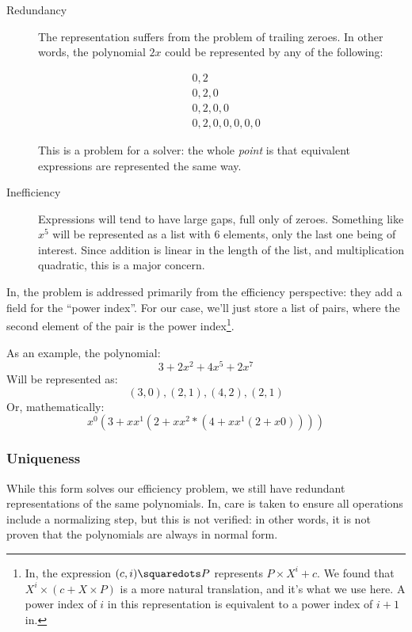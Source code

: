 \documentclass[draft, twocolumn]{article}
\theoremstyle{definition}
\begin{document}
\begin{description}
  \item[Redundancy] The representation suffers from the problem of trailing
    zeroes. In other words, the polynomial $2x$ could be represented by any of
    the following:
  
    \begin{align*}
      & 0, 2 \\
      & 0, 2, 0 \\
      & 0, 2, 0, 0 \\
      & 0, 2, 0, 0, 0, 0, 0
    \end{align*}
    
    This is a problem for a solver: the whole \emph{point} is that equivalent
    expressions are represented the same way.

  \item[Inefficiency] Expressions will tend to have large gaps, full only of
    zeroes. Something like $x^5$ will be represented as a list with 6 elements,
    only the last one being of interest. Since addition is linear in the length
    of the list, and multiplication quadratic, this is a major concern.
\end{description}

In\cite{hutchison_proving_2005}, the problem is addressed primarily from the
efficiency perspective: they add a field for the ``power index''. For our case,
we'll just store a list of pairs, where the second element of the pair is the
power index\footnote{
  In\cite{hutchison_proving_2005}, the expression \((c , i) \squaredots P\)
  represents \(P \times X^i + c\). We found that \(X^i \times (c + X \times P)\)
  is a more natural translation, and it's what we use here. A power index of
  \(i\) in this representation is equivalent to a power index of \(i+1\)
  in\cite{hutchison_proving_2005}.
}.

As an example, the polynomial:
\[ 3 + 2x^2 + 4x^5 + 2x^7 \]
Will be represented as:
\[ (3,0),(2,1),(4,2),(2,1) \]
Or, mathematically:
\[ x^0 (3 + x x^1 (2 + x x^2 * (4 + x x^1 (2 + x 0)))) \]
\subsubsection{Uniqueness}
While this form solves our efficiency problem, we still have redundant
representations of the same polynomials. In\cite{hutchison_proving_2005}, care
is taken to ensure all operations include a normalizing step, but this is not
verified: in other words, it is not proven that the polynomials are always in
normal form.
\end{document}
